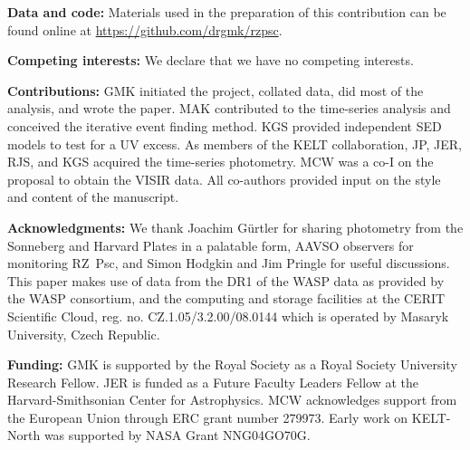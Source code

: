 \documentclass[]{rsos}
\begin{document}
\ack{}

\textbf{Data and code:} Materials used in the preparation of this contribution can be
found online at \href{https://github.com/drgmk/rzpsc}{https://github.com/drgmk/rzpsc}.

\textbf{Competing interests:} We declare that we have no competing interests.

\textbf{Contributions:} GMK initiated the project, collated data, did most of the
analysis, and wrote the paper. MAK contributed to the time-series analysis and conceived
the iterative event finding method. KGS provided independent SED models to test for a UV
excess. As members of the KELT collaboration, JP, JER, RJS, and KGS acquired the
time-series photometry. MCW was a co-I on the proposal to obtain the VISIR data. All
co-authors provided input on the style and content of the manuscript.

\textbf{Acknowledgments:} We thank Joachim G\"urtler for sharing photometry from the
Sonneberg and Harvard Plates in a palatable form, AAVSO observers for monitoring RZ~Psc,
and Simon Hodgkin and Jim Pringle for useful discussions. This paper makes use of data
from the DR1 of the WASP data \cite{2010A&A...520L..10B} as provided by the WASP
consortium, and the computing and storage facilities at the CERIT Scientific Cloud,
reg. no. CZ.1.05/3.2.00/08.0144 which is operated by Masaryk University, Czech Republic.

\textbf{Funding:} GMK is supported by the Royal Society as a Royal Society University
Research Fellow. JER is funded as a Future Faculty Leaders Fellow at the
Harvard-Smithsonian Center for Astrophysics. MCW acknowledges support from the European
Union through ERC grant number 279973. Early work on KELT-North was supported by NASA
Grant NNG04GO70G.

% 

%
\end{document}
